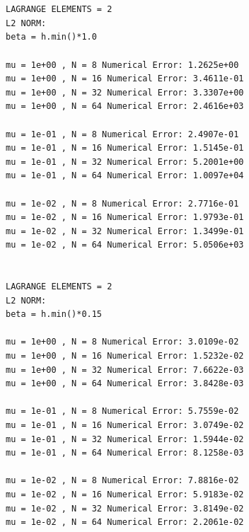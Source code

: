 \documentclass[a4paper,norsk]{article}
\begin{document}
\begin{lstlisting}


LAGRANGE ELEMENTS = 2
L2 NORM:
beta = h.min()*1.0

mu = 1e+00 , N = 8 Numerical Error: 1.2625e+00
mu = 1e+00 , N = 16 Numerical Error: 3.4611e-01
mu = 1e+00 , N = 32 Numerical Error: 3.3307e+00
mu = 1e+00 , N = 64 Numerical Error: 2.4616e+03

mu = 1e-01 , N = 8 Numerical Error: 2.4907e-01
mu = 1e-01 , N = 16 Numerical Error: 1.5145e-01
mu = 1e-01 , N = 32 Numerical Error: 5.2001e+00
mu = 1e-01 , N = 64 Numerical Error: 1.0097e+04

mu = 1e-02 , N = 8 Numerical Error: 2.7716e-01
mu = 1e-02 , N = 16 Numerical Error: 1.9793e-01
mu = 1e-02 , N = 32 Numerical Error: 1.3499e-01
mu = 1e-02 , N = 64 Numerical Error: 5.0506e+03


LAGRANGE ELEMENTS = 2
L2 NORM:
beta = h.min()*0.15

mu = 1e+00 , N = 8 Numerical Error: 3.0109e-02
mu = 1e+00 , N = 16 Numerical Error: 1.5232e-02
mu = 1e+00 , N = 32 Numerical Error: 7.6622e-03
mu = 1e+00 , N = 64 Numerical Error: 3.8428e-03

mu = 1e-01 , N = 8 Numerical Error: 5.7559e-02
mu = 1e-01 , N = 16 Numerical Error: 3.0749e-02
mu = 1e-01 , N = 32 Numerical Error: 1.5944e-02
mu = 1e-01 , N = 64 Numerical Error: 8.1258e-03

mu = 1e-02 , N = 8 Numerical Error: 7.8816e-02
mu = 1e-02 , N = 16 Numerical Error: 5.9183e-02
mu = 1e-02 , N = 32 Numerical Error: 3.8149e-02
mu = 1e-02 , N = 64 Numerical Error: 2.2061e-02


\end{lstlisting}
\end{document}
